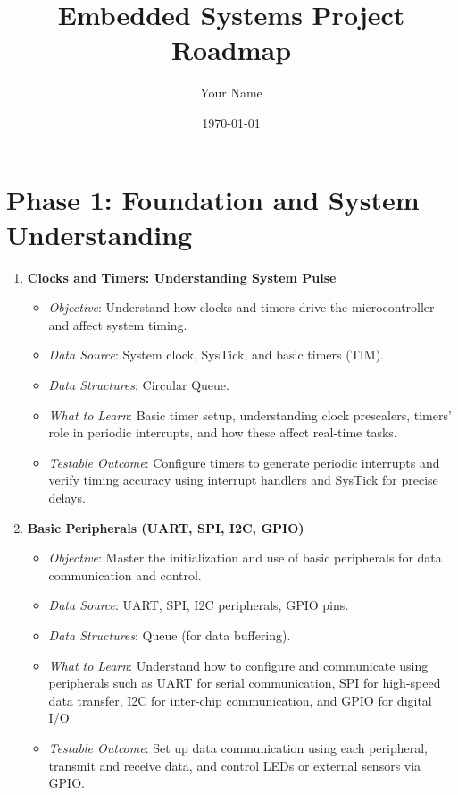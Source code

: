 \documentclass{article}
\begin{document}
\title{Embedded Systems Project Roadmap}
\author{Your Name}
\date{\today}
\maketitle

\section{Phase 1: Foundation and System Understanding}
\begin{enumerate}[label=\arabic*.]
    \item \textbf{Clocks and Timers: Understanding System Pulse}
    \begin{itemize}
        \item \textit{Objective}: Understand how clocks and timers drive the microcontroller and affect system timing.
        \item \textit{Data Source}: System clock, SysTick, and basic timers (TIM).
        \item \textit{Data Structures}: Circular Queue.
        \item \textit{What to Learn}: Basic timer setup, understanding clock prescalers, timers' role in periodic interrupts, and how these affect real-time tasks.
        \item \textit{Testable Outcome}: Configure timers to generate periodic interrupts and verify timing accuracy using interrupt handlers and SysTick for precise delays.
    \end{itemize}

    \item \textbf{Basic Peripherals (UART, SPI, I2C, GPIO)}
    \begin{itemize}
        \item \textit{Objective}: Master the initialization and use of basic peripherals for data communication and control.
        \item \textit{Data Source}: UART, SPI, I2C peripherals, GPIO pins.
        \item \textit{Data Structures}: Queue (for data buffering).
        \item \textit{What to Learn}: Understand how to configure and communicate using peripherals such as UART for serial communication, SPI for high-speed data transfer, I2C for inter-chip communication, and GPIO for digital I/O.
        \item \textit{Testable Outcome}: Set up data communication using each peripheral, transmit and receive data, and control LEDs or external sensors via GPIO.
    \end{itemize}


\end{enumerate}
\end{document}
